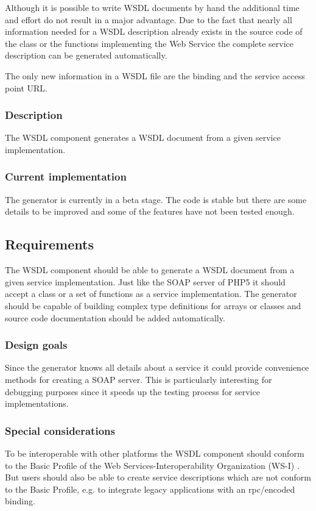 \documentclass[10pt,final,a4paper,oneside]{article}
\begin{document}
Although it is possible
to write WSDL documents by hand
the additional time and effort
do not result in a major advantage.
Due to the fact that nearly all information
needed for a WSDL description already exists
in the source code of the class or the functions
implementing the Web Service
the complete service description
can be generated automatically.

The only new information in a WSDL file
are the binding and the service access point URL.

\subsubsection{Description}
The WSDL component generates a WSDL document
from a given service implementation.

\subsubsection{Current implementation}
The generator is currently in a beta stage.
The code is stable but there are some details to be improved
and some of the features have not been tested enough.

\subsection{Requirements}\label{subsec:WSDLRequirements}
The WSDL component should be able to generate a WSDL document
from a given service implementation.
Just like the SOAP server of PHP5 it should accept
a class or a set of functions as a service implementation.
The generator should be capable of building complex type definitions
for arrays or classes and source code documentation should be added
automatically.

\subsubsection{Design goals}

Since the generator knows all details about a service
it could provide convenience methods for creating a SOAP server.
This is particularly interesting for debugging purposes
since it speeds up the testing process for service implementations.

\subsubsection{Special considerations}
To be interoperable with other platforms
the WSDL component should conform
to the Basic Profile of the
Web Services-Interoperability Organization (WS-I) \cite{BasicProfile}.
But users should also be able to create service descriptions
which are not conform to the Basic Profile,
e.g. to integrate legacy applications
with an rpc/encoded binding.
\end{document}
